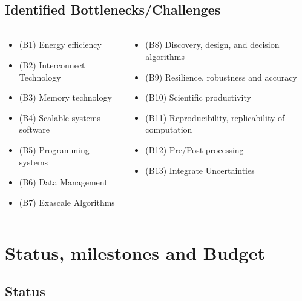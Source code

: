 \subsection{Identified Bottlenecks/Challenges}
\begin{frame}[fragile=singleslide]{\insertsectionhead}
  \framesubtitle{\insertsubsectionhead}
  \scriptsize
  \begin{columns}[]
    \begin{column}{.5\linewidth}
      \begin{itemize}
        \item (B1) Energy efficiency
        \item (B2) Interconnect Technology
        \item (B3) Memory technology
        \item (B4) Scalable systems software
        \item (B5) Programming systems
        \item (B6) Data Management
        \item (B7) Exascale Algorithms
      \end{itemize}
    \end{column}
    \begin{column}{.5\linewidth}
      \begin{itemize}
        \item (B8) Discovery, design, and decision algorithms
        \item (B9) Resilience, robustness and accuracy
        \item (B10) Scientific productivity
        \item (B11) Reproducibility, replicability of computation
        \item (B12) Pre/Post-processing
        \item (B13) Integrate Uncertainties
      \end{itemize}
    \end{column}
  \end{columns}

  
\end{frame}
\section{Status, milestones and Budget}

\subsection{Status}

